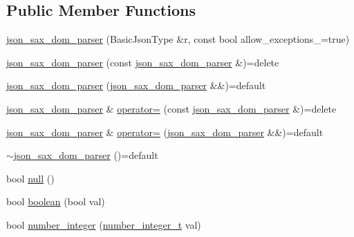 \subsection*{Public Member Functions}
\begin{DoxyCompactItemize}
\item 
\hyperlink{classnlohmann_1_1detail_1_1json__sax__dom__parser_afc50fee0a92ce84afb84041ebbdfba80}{json\+\_\+sax\+\_\+dom\+\_\+parser} (Basic\+Json\+Type \&r, const bool allow\+\_\+exceptions\+\_\+=true)
\item 
\hyperlink{classnlohmann_1_1detail_1_1json__sax__dom__parser_a0a00cd158d678e294f6e974cd9373c4b}{json\+\_\+sax\+\_\+dom\+\_\+parser} (const \hyperlink{classnlohmann_1_1detail_1_1json__sax__dom__parser}{json\+\_\+sax\+\_\+dom\+\_\+parser} \&)=delete
\item 
\hyperlink{classnlohmann_1_1detail_1_1json__sax__dom__parser_ad6e588652d5a9cb647a3c32a6221f13e}{json\+\_\+sax\+\_\+dom\+\_\+parser} (\hyperlink{classnlohmann_1_1detail_1_1json__sax__dom__parser}{json\+\_\+sax\+\_\+dom\+\_\+parser} \&\&)=default
\item 
\hyperlink{classnlohmann_1_1detail_1_1json__sax__dom__parser}{json\+\_\+sax\+\_\+dom\+\_\+parser} \& \hyperlink{classnlohmann_1_1detail_1_1json__sax__dom__parser_a98448bf2cbc15d15e2eddc5a09a40a42}{operator=} (const \hyperlink{classnlohmann_1_1detail_1_1json__sax__dom__parser}{json\+\_\+sax\+\_\+dom\+\_\+parser} \&)=delete
\item 
\hyperlink{classnlohmann_1_1detail_1_1json__sax__dom__parser}{json\+\_\+sax\+\_\+dom\+\_\+parser} \& \hyperlink{classnlohmann_1_1detail_1_1json__sax__dom__parser_aff928a07e40e4efb16b3ff9384f4401c}{operator=} (\hyperlink{classnlohmann_1_1detail_1_1json__sax__dom__parser}{json\+\_\+sax\+\_\+dom\+\_\+parser} \&\&)=default
\item 
\hyperlink{classnlohmann_1_1detail_1_1json__sax__dom__parser_a4b93deb5c1d716dcfb33b3ed8a00ac4d}{$\sim$json\+\_\+sax\+\_\+dom\+\_\+parser} ()=default
\item 
bool \hyperlink{classnlohmann_1_1detail_1_1json__sax__dom__parser_abb06babaa861f123d8d0cb443b887d8a}{null} ()
\item 
bool \hyperlink{classnlohmann_1_1detail_1_1json__sax__dom__parser_a476c4634b93546a1a555725e551c2b33}{boolean} (bool val)
\item 
bool \hyperlink{classnlohmann_1_1detail_1_1json__sax__dom__parser_aff77f861ba336df48c9786a993941397}{number\+\_\+integer} (\hyperlink{classnlohmann_1_1detail_1_1json__sax__dom__parser_a3d5cd67d179aa7422ce90e54984a441e}{number\+\_\+integer\+\_\+t} val)

\end{DoxyCompactItemize}

